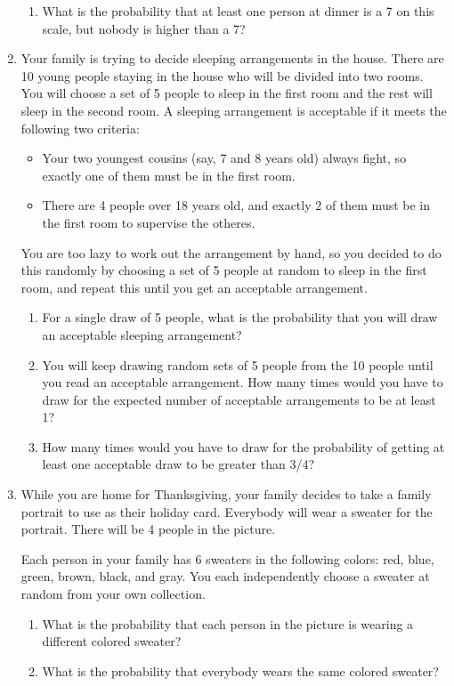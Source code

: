 \documentclass[11pt]{article}
\begin{document}
\begin{enumerate}
\begin{enumerate}
\item What is the probability that at least one person at dinner is a 7 on this scale, but nobody is higher than a 7?
\end{enumerate}

\item Your family is trying to decide sleeping arrangements in the house. There are 10 young people staying in the house who will be divided into two rooms. You will choose a set of 5 people to sleep in the first room and the rest will sleep in the second room. A sleeping arrangement is acceptable if it meets the following two criteria:
\begin{itemize}
\item Your two youngest cousins (say, 7 and 8 years old) always fight, so exactly one of them must be in the first room. 
\item There are 4 people over 18 years old, and exactly 2 of them must be in the first room to supervise the otheres.
\end{itemize}
You are too lazy to work out the arrangement by hand, so you decided to do this randomly by choosing a set of 5 people at random to sleep in the first room, and repeat this until you get an acceptable arrangement.
\begin{enumerate}
\item For a single draw of 5 people, what is the probability that you will draw an acceptable sleeping arrangement?
\item You will keep drawing random sets of 5 people from the 10 people until you read an acceptable arrangement. How many times would you have to draw for the expected number of acceptable arrangements to be at least 1?
\item How many times would you have to draw for the probability of getting at least one acceptable draw to be greater than 3/4?
\end{enumerate}

\item While you are home for Thanksgiving, your family decides to take a family portrait to use as their holiday card. Everybody will wear a sweater for the portrait. There will be 4 people in the picture.

Each person in your family has 6 sweaters in the following colors: red, blue, green, brown, black, and gray. You each independently choose a sweater at random from your own collection.
\begin{enumerate}
\item What is the probability that each person in the picture is wearing a different colored sweater? 
\item What is the probability that everybody wears the same colored sweater?
\end{enumerate}


\end{enumerate}
\end{document}
